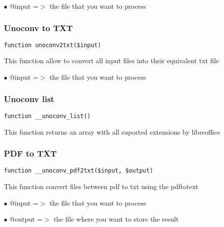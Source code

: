 \documentclass[a4paper]{article}
\begin{document}
\begin{compactitem}
\item[\color{myblue}$\bullet$] @input =$>$ the file that you want to process
\end{compactitem}

\hypertarget{toc536}{}
\subsubsection{Unoconv to TXT}

\begin{lstlisting}
function unoconv2txt($input)
\end{lstlisting}

This function allow to convert all input files into their equivalent txt file

\begin{compactitem}
\item[\color{myblue}$\bullet$] @input =$>$ the file that you want to process
\end{compactitem}

\hypertarget{toc537}{}
\subsubsection{Unoconv list}

\begin{lstlisting}
function __unoconv_list()
\end{lstlisting}

This function returns an array with all suported extensions by libreoffice

\hypertarget{toc538}{}
\subsubsection{PDF to TXT}

\begin{lstlisting}
function __unoconv_pdf2txt($input, $output)
\end{lstlisting}

This function convert files between pdf to txt using the pdftotext

\begin{compactitem}
\item[\color{myblue}$\bullet$] @input  =$>$ the file that you want to process
\item[\color{myblue}$\bullet$] @output =$>$ the file where you want to store the result
\end{compactitem}
\end{document}
